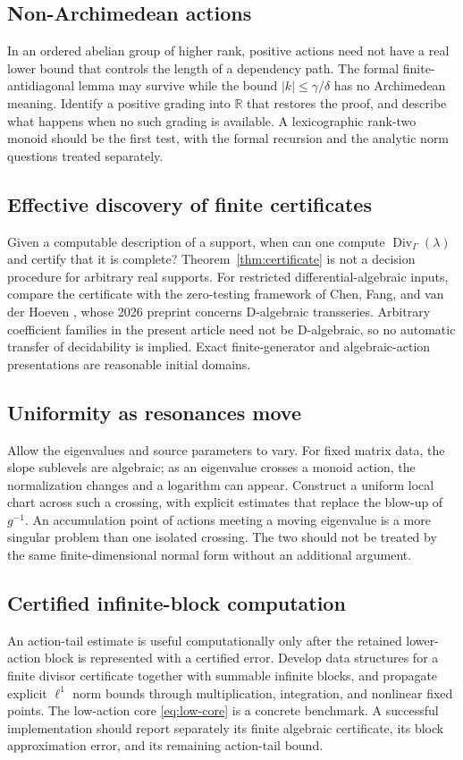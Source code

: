 \documentclass[11pt,a4paper]{article}
\numberwithin{equation}{section}
\theoremstyle{definition}
\theoremstyle{remark}
\newcommand{\RR}{\mathbb R}
\newcommand{\G}{\Gamma}
\newcommand{\Div}{\operatorname{Div}}
\begin{document}
\subsection{Non-Archimedean actions}
In an ordered abelian group of higher rank, positive actions need
not have a real lower bound that controls the length of a dependency
path. The formal finite-antidiagonal lemma may survive while the
bound \(|k|\le\gamma/\delta\) has no Archimedean meaning.
Identify a positive grading into \(\RR\) that restores the proof,
and describe what happens when no such grading is available.
A lexicographic rank-two monoid should be the first test, with the
formal recursion and the analytic norm questions treated separately.

\subsection{Effective discovery of finite certificates}
Given a computable description of a support, when can one compute
\(\Div_\G(\lambda)\) and certify that it is complete? Theorem~\ref{thm:certificate}
is not a decision procedure for arbitrary real supports. For
restricted differential-algebraic inputs, compare the certificate
with the zero-testing framework of Chen, Fang, and van der Hoeven
\cite{chen-fang-vdh}, whose 2026 preprint concerns D-algebraic
transseries. Arbitrary coefficient families in the present article
need not be D-algebraic, so no automatic transfer of decidability is
implied. Exact finite-generator and algebraic-action presentations
are reasonable initial domains.

\subsection{Uniformity as resonances move}
Allow the eigenvalues and source parameters to vary. For fixed
matrix data, the slope sublevels are algebraic; as an eigenvalue
crosses a monoid action, the normalization changes and a logarithm
can appear. Construct a uniform local chart across such a crossing,
with explicit estimates that replace the blow-up of \(g^{-1}\).
An accumulation point of actions meeting a moving eigenvalue is a
more singular problem than one isolated crossing. The two should
not be treated by the same finite-dimensional normal form without
an additional argument.

\subsection{Certified infinite-block computation}
An action-tail estimate is useful computationally only after the
retained lower-action block is represented with a certified error.
Develop data structures for a finite divisor certificate together
with summable infinite blocks, and propagate explicit \(\ell^1\)
norm bounds through multiplication, integration, and nonlinear
fixed points. The low-action core \eqref{eq:low-core} is a concrete
benchmark. A successful implementation should report separately
its finite algebraic certificate, its block approximation error,
and its remaining action-tail bound.
\end{document}
